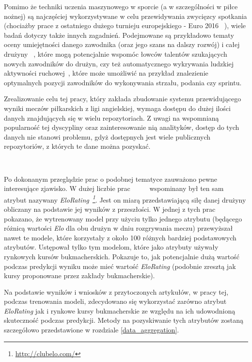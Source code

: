 Pomimo że techniki uczenia maszynowego w sporcie (a w szczególności w piłce nożnej) są najczęściej wykorzystywane w celu przewidywania zwycięzcy spotkania (chociażby prace z ostatniego dużego turnieju europejskiego - Euro 2016~\cite{Euro2016-1} \cite{Euro2016-2} \cite{Euro2016-3}), wiele badań dotyczy także innych zagadnień. Podejmowane są przykładowo tematy oceny umiejętności danego zawodnika (oraz jego szans na dalszy rozwój) i całej drużyny~\cite{ml_soccer_analytics} \cite{soccer_players_skill}, które mogą potencjalnie wspomóc łowców talentów szukających nowych zawodników do drużyn, czy też automatycznego wykrywania ludzkiej aktywności ruchowej~\cite{activity_recignition}, które może umożliwić na przykład znalezienie optymalnych pozycji zawodników do wykonywania strzału, podania czy sprintu.

Zrealizowanie celu tej pracy, który zakłada zbudowanie systemu przewidującego wyniki meczów piłkarskich z ligi angielskiej, wymaga dostępu do dużej ilości danych znajdujących się w wielu repozytoriach. Z uwagi na wspomnianą popularność tej dyscypliny oraz zainteresowanie nią analityków, dostęp do tych danych nie stanowi problemu, gdyż dostępnych jest wiele publicznych repozytoriów, z których te dane można pozyskać.

~

Po dokonanym przeglądzie prac o podobnej tematyce zauważono pewne interesujące zjawisko. W dużej liczbie prac~\cite{WorldCup-2018}~\cite{EloRating-1}~\cite{Euro2016-1}~\cite{Euro2016-2}~\cite{Euro2016-3} wspominany był ten sam atrybut nazywany \emph{EloRating~\footnote{\url{http://clubelo.com/}}}. Jest on  miarą przedstawiającą siłę danej drużyny obliczany na podstawie jej wyników z przeszłości. W jednej z tych prac~\cite{EloRating-1} pokazano, że wytrenowany model przy użyciu tylko jednego atrybutu (będącego różnicą wartości \emph{Elo} dla obu drużyn w dniu rozgrywania meczu) przewyższał nawet te modele, które korzystały z około 100 różnych bardziej podstawowych atrybutów. Ustępował tylko tym modelom, które jako atrybuty używały rynkowych kursów bukmacherskich. Pokazuje to, jak potencjalnie dużą wartość podczas predykcji wyniku może mieć wartość \emph{EloRating} (podobnie zresztą jak kursy proponowane przez zakłady bukmacherskie).

Na podstawie wyników i wniosków z przytoczonych artykułów, w pracy tej, podczas trenowania modeli, zdecydowano się wykorzystać zarówno atrybut \emph{EloRating} jak i rynkowe kursy bukmacherskie ze względu na ich udowodnioną skuteczność podczas predykcji. Metody na pozyskiwanie tych atrybutów zostaną szczegółowo przedstawione w rozdziale \ref{data_aggregation}.


